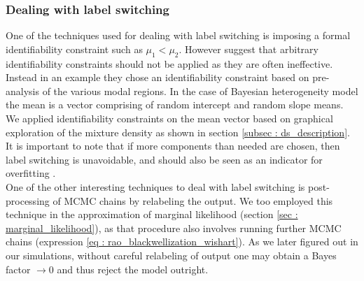 \subsubsection{Dealing with label switching}
One of the techniques used for dealing with label switching is imposing a formal identifiability constraint such as $\mu_1 < \mu_2$. However \citet{fruhwirth-schnatter_bayesian_2004} suggest that arbitrary identifiability constraints should not be applied as they are often ineffective. Instead in an example they chose an identifiability constraint based on pre-analysis of the various modal regions. In the case of Bayesian heterogeneity model the mean is a vector comprising of random intercept and random slope means. We applied identifiability constraints on the mean vector based on graphical exploration of the mixture density as shown in section \ref{subsec : ds_description}. It is important to note that if more components than needed are chosen, then label switching is unavoidable, and should also be seen as an indicator for overfitting \citep[pg. 104]{fruhwirth-schnatter_finite_2013}.\\

One of the other interesting techniques to deal with label switching is post-processing of MCMC chains by relabeling the output\citep{richardson_bayesian_1997,stephens_dealing_2000}. We too employed this technique in the approximation of marginal likelihood (section \ref{sec : marginal_likelihood}), as that procedure also involves running further MCMC chains (expression \ref{eq : rao_blackwellization_wishart}). As we later figured out in our simulations, without careful relabeling of output one may obtain a Bayes factor $\to 0$ and thus reject the model outright.